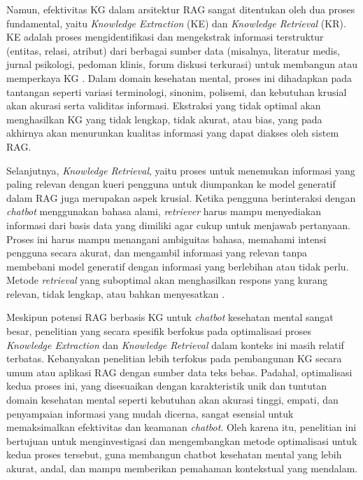 Namun, efektivitas KG dalam arsitektur RAG sangat ditentukan oleh dua proses fundamental, yaitu \textit{Knowledge Extraction} (KE) dan \textit{Knowledge Retrieval} (KR).
KE adalah proses mengidentifikasi dan mengekstrak informasi terstruktur (entitas, relasi, atribut) dari berbagai sumber data (misalnya, literatur medis, jurnal psikologi, pedoman klinis, forum diskusi terkurasi) untuk membangun atau memperkaya KG \cite{Choi2025KnowledgeGraphConstruction}.
Dalam domain kesehatan mental, proses ini dihadapkan pada tantangan seperti variasi terminologi, sinonim, polisemi, dan kebutuhan krusial akan akurasi serta validitas informasi.
Ekstraksi yang tidak optimal akan menghasilkan KG yang tidak lengkap, tidak akurat, atau bias, yang pada akhirnya akan menurunkan kualitas informasi yang dapat diakses oleh sistem RAG.

Selanjutnya, \textit{Knowledge Retrieval}, yaitu proses untuk menemukan informasi yang paling relevan dengan kueri pengguna untuk diumpankan ke model generatif dalam RAG juga merupakan aspek krusial.
Ketika pengguna berinteraksi dengan \textit{chatbot} menggunakan bahasa alami, \textit{retriever} harus mampu menyediakan informasi dari basis data yang dimiliki agar cukup untuk menjawab pertanyaan.
Proses ini harus mampu menangani ambiguitas bahasa, memahami intensi pengguna secara akurat, dan mengambil informasi yang relevan tanpa membebani model generatif dengan informasi yang berlebihan atau tidak perlu.
Metode \textit{retrieval} yang suboptimal akan menghasilkan respons yang kurang relevan, tidak lengkap, atau bahkan menyesatkan \cite{Edge2025LocalGlobalGraphRAG}.

Meskipun potensi RAG berbasis KG untuk \textit{chatbot} kesehatan mental sangat besar, penelitian yang secara spesifik berfokus pada optimalisasi proses \textit{Knowledge Extraction} dan \textit{Knowledge Retrieval} dalam konteks ini masih relatif terbatas.
Kebanyakan penelitian lebih terfokus pada pembangunan KG secara umum atau aplikasi RAG dengan sumber data teks bebas.
Padahal, optimalisasi kedua proses ini, yang disesuaikan dengan karakteristik unik dan tuntutan domain kesehatan mental seperti kebutuhan akan akurasi tinggi, empati, dan penyampaian informasi yang mudah dicerna, sangat esensial untuk memaksimalkan efektivitas dan keamanan \textit{chatbot}.
Oleh karena itu, penelitian ini bertujuan untuk menginvestigasi dan mengembangkan metode optimalisasi untuk kedua proses tersebut, guna membangun chatbot kesehatan mental yang lebih akurat, andal, dan mampu memberikan pemahaman kontekstual yang mendalam.


